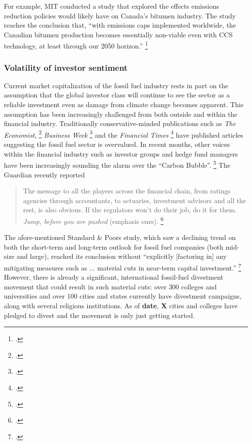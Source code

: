 For example, MIT conducted a study that explored the effects  emissions reduction policies would likely have on Canada's bitumen industry.
The study reaches the conclusion that, ``with  emissions caps implemented worldwide, the Canadian bitumen production becomes essentially non-viable even with CCS technology, at least through our 2050 horizon.'' \footcite{MITContraints}



\subsubsection {Volatility of investor sentiment}



Current market capitalization of the fossil fuel industry rests in part on the assumption that the global investor class will continue to see the sector as a reliable investment even as damage from climate change becomes apparent. 
This assumption has been increasingly challenged from both outside and within the financial industry. 
Traditionally conservative-minded publications such as \emph{The Economist}, \footcite{EconomistUnburnable} \emph{Business Week} \footcite{BusinessWeekOvervalued} and the \emph{Financial Times} \footcite{FTOvervalued} have published articles suggesting the fossil fuel sector is overvalued. 
In recent months, other voices within the financial industry such as investor groups and hedge fund managers have been increasingly sounding the alarm over the ``Carbon Bubble''. \footcite{JeremyGrantham} 
The Guardian recently reported
\begin{quote}
The message to all the players across the financial chain, from ratings agencies through accountants, to actuaries, investment advisors and all the rest, is also obvious. If the regulators won't do their job, do it for them. \emph{Jump, before you are pushed} (emphasis ours). \footcite{Guardian6Trillion}
\end{quote}
The afore-mentioned Standard \& Poors study, which saw a declining trend on both the short-term and long-term outlook for fossil fuel companies (both mid-size and large), reached its conclusion without ``explicitly [factoring in] any mitigating measures such as ... material cuts in near-term capital investment.'' \footcite{SandPConstrained}
However, there is already a significant, international fossil-fuel divestment movement that could result in such material cuts: over 300 colleges and universities and over 100 cities and states currently have divestment campaigns, along with several religious institutions.
As of \textbf{date}, \textbf{X} cities and \textbf{} colleges have pledged to divest and the movement is only just getting started.



